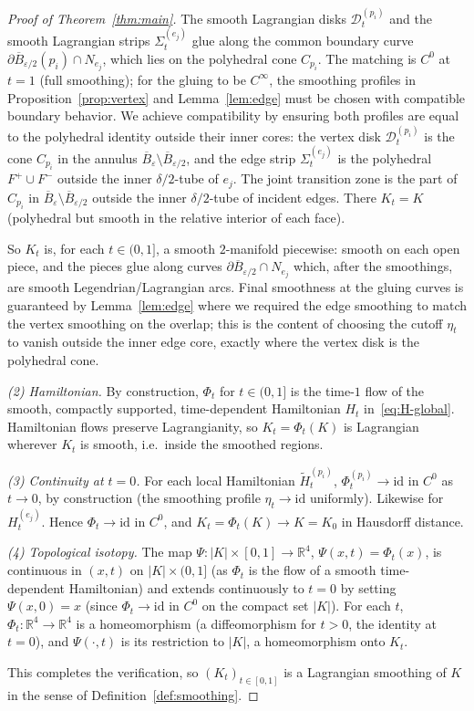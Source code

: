 \documentclass[12pt]{article}
\theoremstyle{definition}
\begin{document}
\begin{proof}[Proof of Theorem~\ref{thm:main}]
The smooth Lagrangian disks $\mathcal{D}_t^{(p_i)}$ and the smooth Lagrangian strips $\Sigma_t^{(e_j)}$ glue along the common boundary curve $\partial\overline{B}_{\varepsilon/2}(p_i)\cap N_{e_j}$, which lies on the polyhedral cone $C_{p_i}$. The matching is $C^0$ at $t=1$ (full smoothing); for the gluing to be $C^\infty$, the smoothing profiles in Proposition~\ref{prop:vertex} and Lemma~\ref{lem:edge} must be chosen with compatible boundary behavior. We achieve compatibility by ensuring both profiles are equal to the polyhedral identity outside their inner cores: the vertex disk $\mathcal{D}_t^{(p_i)}$ is the cone $C_{p_i}$ in the annulus $\overline{B}_\varepsilon\setminus\overline{B}_{\varepsilon/2}$, and the edge strip $\Sigma_t^{(e_j)}$ is the polyhedral $F^+\cup F^-$ outside the inner $\delta/2$-tube of $e_j$. The joint transition zone is the part of $C_{p_i}$ in $\overline{B}_\varepsilon\setminus\overline{B}_{\varepsilon/2}$ outside the inner $\delta/2$-tube of incident edges. There $K_t=K$ (polyhedral but smooth in the relative interior of each face).

So $K_t$ is, for each $t\in(0,1]$, a smooth $2$-manifold piecewise: smooth on each open piece, and the pieces glue along curves $\partial\overline{B}_{\varepsilon/2}\cap N_{e_j}$ which, after the smoothings, are smooth Legendrian/Lagrangian arcs. Final smoothness at the gluing curves is guaranteed by Lemma~\ref{lem:edge} where we required the edge smoothing to match the vertex smoothing on the overlap; this is the content of choosing the cutoff $\eta_t$ to vanish outside the inner edge core, exactly where the vertex disk is the polyhedral cone.

\emph{(2) Hamiltonian.}
By construction, $\Phi_t$ for $t\in(0,1]$ is the time-$1$ flow of the smooth, compactly supported, time-dependent Hamiltonian $H_t$ in~\eqref{eq:H-global}. Hamiltonian flows preserve Lagrangianity, so $K_t=\Phi_t(K)$ is Lagrangian wherever $K_t$ is smooth, i.e.\ inside the smoothed regions.

\emph{(3) Continuity at $t=0$.}
For each local Hamiltonian $\widetilde H_t^{(p_i)}$, $\Phi_t^{(p_i)}\to\mathrm{id}$ in $C^0$ as $t\to 0$, by construction (the smoothing profile $\eta_t\to\mathrm{id}$ uniformly). Likewise for $H_t^{(e_j)}$. Hence $\Phi_t\to\mathrm{id}$ in $C^0$, and $K_t=\Phi_t(K)\to K=K_0$ in Hausdorff distance.

\emph{(4) Topological isotopy.}
The map $\Psi:|K|\times[0,1]\to\mathbb{R}^4$, $\Psi(x,t)=\Phi_t(x)$, is continuous in $(x,t)$ on $|K|\times(0,1]$ (as $\Phi_t$ is the flow of a smooth time-dependent Hamiltonian) and extends continuously to $t=0$ by setting $\Psi(x,0)=x$ (since $\Phi_t\to\mathrm{id}$ in $C^0$ on the compact set $|K|$). For each $t$, $\Phi_t:\mathbb{R}^4\to\mathbb{R}^4$ is a homeomorphism (a diffeomorphism for $t>0$, the identity at $t=0$), and $\Psi(\cdot,t)$ is its restriction to $|K|$, a homeomorphism onto $K_t$.

This completes the verification, so $(K_t)_{t\in[0,1]}$ is a Lagrangian smoothing of $K$ in the sense of Definition~\ref{def:smoothing}.
\end{proof}
\end{document}
